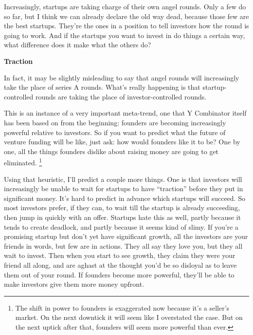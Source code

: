 Increasingly, startups are taking charge of their own angel rounds. Only
a few do so far, but I think we can already declare the old way dead,
because those few are the best startups. They're the ones in a position
to tell investors how the round is going to work. And if the startups
you want to invest in do things a certain way, what difference does it
make what the others do?

\textbf{Traction}

In fact, it may be slightly misleading to say that angel rounds will
increasingly take the place of series A rounds. What's really happening
is that startup-controlled rounds are taking the place of
investor-controlled rounds.

This is an instance of a very important meta-trend, one that Y
Combinator itself has been based on from the beginning: founders are
becoming increasingly powerful relative to investors. So if you want to
predict what the future of venture funding will be like, just ask: how
would founders like it to be? One by one, all the things founders
dislike about raising money are going to get eliminated.
\footnote{The shift in power to founders is exaggerated now because it's
a seller's market. On the next downtick it will seem like I overstated
the case. But on the next uptick after that, founders will seem more
powerful than ever.}

Using that heuristic, I'll predict a couple more things. One is that
investors will increasingly be unable to wait for startups to have
``traction'' before they put in significant money. It's hard to predict
in advance which startups will succeed. So most investors prefer, if
they can, to wait till the startup is already succeeding, then jump in
quickly with an offer. Startups hate this as well, partly because it
tends to create deadlock, and partly because it seems kind of slimy. If
you're a promising startup but don't yet have significant growth, all
the investors are your friends in words, but few are in actions. They
all say they love you, but they all wait to invest. Then when you start
to see growth, they claim they were your friend all along, and are
aghast at the thought you'd be so disloyal as to leave them out of your
round. If founders become more powerful, they'll be able to make
investors give them more money upfront.

